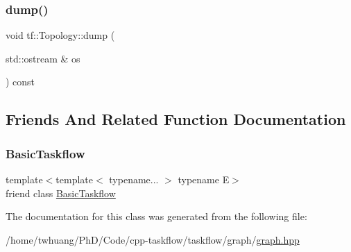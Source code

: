 \mbox{\label{classtf_1_1Topology_a724a982f74804e5ea072845e9c7389a3}} 
\subsubsection{\texorpdfstring{dump()}{dump()}\hspace{0.1cm}{\footnotesize\ttfamily [2/2]}}
{\footnotesize\ttfamily void tf\+::\+Topology\+::dump (\begin{DoxyParamCaption}\item[{std\+::ostream \&}]{os }\end{DoxyParamCaption}) const\hspace{0.3cm}{\ttfamily [inline]}}



\subsection{Friends And Related Function Documentation}
\mbox{\label{classtf_1_1Topology_ab3ad8c5c7ed22c3fbd8a41b84db75083}} 
\subsubsection{\texorpdfstring{Basic\+Taskflow}{BasicTaskflow}}
{\footnotesize\ttfamily template$<$template$<$ typename... $>$ typename E$>$ \\
friend class \hyperlink{classtf_1_1BasicTaskflow}{Basic\+Taskflow}\hspace{0.3cm}{\ttfamily [friend]}}



The documentation for this class was generated from the following file\+:\begin{DoxyCompactItemize}
\item 
/home/twhuang/\+Ph\+D/\+Code/cpp-\/taskflow/taskflow/graph/\hyperlink{graph_8hpp}{graph.\+hpp}\end{DoxyCompactItemize}

